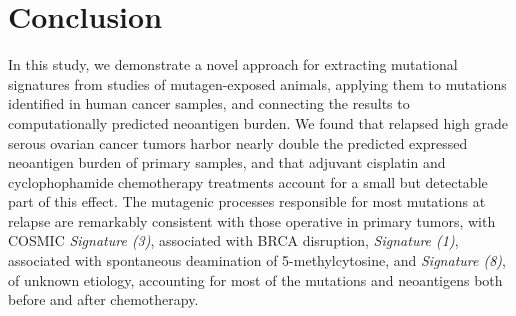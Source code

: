 \section*{Conclusion}
In this study, we demonstrate a novel approach for extracting mutational signatures from studies of mutagen-exposed animals, applying them to mutations identified in human cancer samples, and connecting the results to computationally predicted neoantigen burden. We found that relapsed high grade serous ovarian cancer tumors harbor nearly double the predicted expressed neoantigen burden of primary samples, and that adjuvant cisplatin and cyclophophamide chemotherapy treatments account for a small but detectable part of this effect. The mutagenic processes responsible for most mutations at relapse are remarkably consistent with those operative in primary tumors, with COSMIC \textit{Signature (3)}, associated with BRCA disruption, \textit{Signature (1)}, associated with spontaneous deamination of 5-methylcytosine, and \textit{Signature (8)}, of unknown etiology, accounting for most of the mutations and neoantigens both before and after chemotherapy.